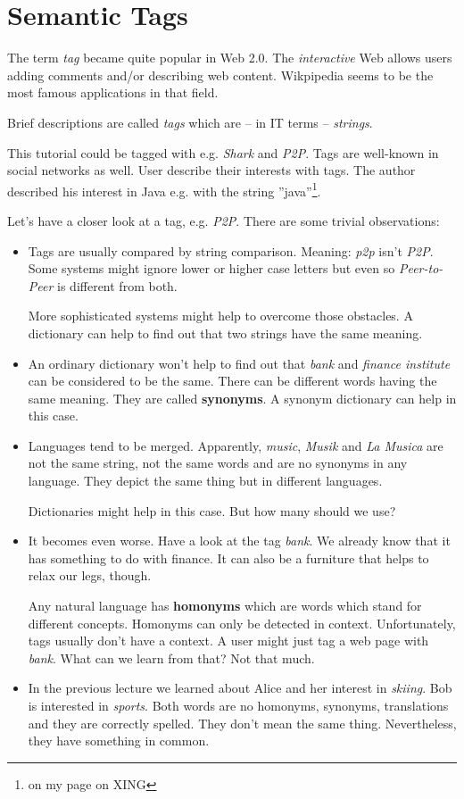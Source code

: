 \chapter{Semantic Tags}
The term {\it tag} became quite popular in Web 2.0. The {\it interactive} Web allows users adding comments and/or describing web content. Wikpipedia seems to be the most famous applications in that field.

Brief descriptions are called {\it tags} which are -- in IT terms -- {\it strings}.

This tutorial could be tagged with e.g. {\it Shark} and {\it P2P}.
Tags are well-known in social networks as well. User describe their interests with tags. The author described his interest in Java e.g. with the string ''java''\footnote{on my page on XING}.

Let's have a closer look at a tag, e.g. {\it P2P}. There are some trivial observations:

\begin{itemize}
\item
Tags are usually compared by string comparison. Meaning: {\it p2p} isn't {\it P2P}. Some systems might ignore lower or higher case letters but even so {\it Peer-to-Peer} is different from both.

More sophisticated systems might help to overcome those obstacles. A dictionary can help to find out that two strings have the same meaning.

\item
An ordinary dictionary won't help to find out that {\it bank} and {\it finance institute} can be considered to be the same. There can be different words having the same meaning. They are called {\bf synonyms}. A synonym dictionary can help in this case.

\item
Languages tend to be merged. Apparently, {\it music}, {\it Musik} and {\it La Musica} are not the same string, not the same words and are no synonyms in any language. They depict the same thing but in different languages.

Dictionaries might help in this case. But how many should we use?

\item
It becomes even worse. Have a look at the tag {\it bank}. We already know that it has something to do with finance. It can also be a furniture that helps to relax our legs, though.

Any natural language has {\bf homonyms} which are words which stand for different concepts. Homonyms can only be detected in context. Unfortunately, tags usually don't have a context. A user might just tag a web page with {\it bank}. What can we learn from that? Not that much.

\item
In the previous lecture we learned about Alice and her interest in {\it skiing}.
Bob is interested in {\it sports}. Both words are no homonyms, synonyms, translations and they are correctly spelled. They don't mean the same thing. Nevertheless, they have something in common.

\end{itemize}


